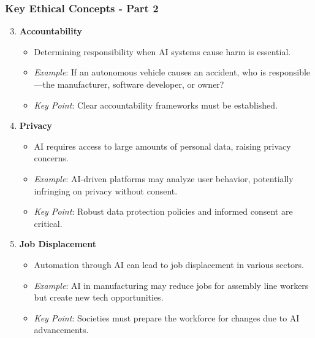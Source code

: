 \documentclass[aspectratio=169]{beamer}
\begin{document}
\begin{frame}[fragile]
    \frametitle{Key Ethical Concepts - Part 2}
    \begin{enumerate}
        \setcounter{enumi}{2}
        \item \textbf{Accountability}
        \begin{itemize}
            \item Determining responsibility when AI systems cause harm is essential.
            \item \textit{Example}: If an autonomous vehicle causes an accident, who is responsible—the manufacturer, software developer, or owner?
            \item \textit{Key Point}: Clear accountability frameworks must be established.
        \end{itemize}

        \item \textbf{Privacy}
        \begin{itemize}
            \item AI requires access to large amounts of personal data, raising privacy concerns.
            \item \textit{Example}: AI-driven platforms may analyze user behavior, potentially infringing on privacy without consent.
            \item \textit{Key Point}: Robust data protection policies and informed consent are critical.
        \end{itemize}

        \item \textbf{Job Displacement}
        \begin{itemize}
            \item Automation through AI can lead to job displacement in various sectors.
            \item \textit{Example}: AI in manufacturing may reduce jobs for assembly line workers but create new tech opportunities.
            \item \textit{Key Point}: Societies must prepare the workforce for changes due to AI advancements.
        \end{itemize}
    \end{enumerate}
\end{frame}
\end{document}
